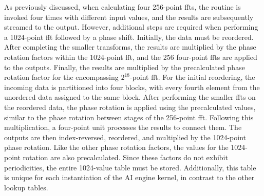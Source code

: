 As previously discussed, when calculating four 256-point \ac{fft}s, the routine is invoked four times with different input values, and the results are subsequently streamed to the output. However, additional steps are required when performing a 1024-point \ac{fft} followed by a phase shift. Initially, the data must be reordered. After completing the smaller transforms, the results are multiplied by the phase rotation factors within the 1024-point \ac{fft}, and the 256 four-point \ac{fft}s are applied to the outputs. Finally, the results are multiplied by the precalculated phase rotation factor for the encompassing $2^{18}$-point \ac{fft}. For the initial reordering, the incoming data is partitioned into four blocks, with every fourth element from the unordered data assigned to the same block. After performing the smaller \ac{fft}s on the reordered data, the phase rotation is applied using the precalculated values, similar to the phase rotation between stages of the 256-point \ac{fft}. Following this multiplication, a four-point unit processes the results to connect them. The outputs are then index-reversed, reordered, and multiplied by the 1024-point phase rotation. Like the other phase rotation factors, the values for the 1024-point rotation are also precalculated. Since these factors do not exhibit periodicities, the entire 1024-value table must be stored. Additionally, this table is unique for each instantiation of the AI engine kernel, in contrast to the other lookup tables.
